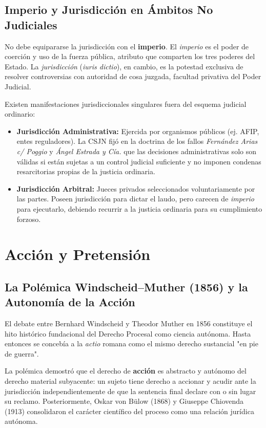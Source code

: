 \documentclass[12pt,oneside]{book}
\begin{document}
\subsection{Imperio y Jurisdicción en Ámbitos No Judiciales}
\begin{important}
No debe equipararse la jurisdicción con el \textbf{imperio}. El \textit{imperio} es el poder de coerción y uso de la fuerza pública, atributo que comparten los tres poderes del Estado. La \textit{jurisdicción} (\textit{iuris dictio}), en cambio, es la potestad exclusiva de resolver controversias con autoridad de cosa juzgada, facultad privativa del Poder Judicial.
\end{important}

Existen manifestaciones jurisdiccionales singulares fuera del esquema judicial ordinario:
\begin{itemize}
    \item \textbf{Jurisdicción Administrativa:} Ejercida por organismos públicos (ej. AFIP, entes reguladores). La CSJN fijó en la doctrina de los fallos \textit{Fernández Arias c/ Poggio} y \textit{Ángel Estrada y Cía.} que las decisiones administrativas solo son válidas si están sujetas a un control judicial suficiente y no imponen condenas resarcitorias propias de la justicia ordinaria.
    \item \textbf{Jurisdicción Arbitral:} Jueces privados seleccionados voluntariamente por las partes. Poseen jurisdicción para dictar el laudo, pero carecen de \textit{imperio} para ejecutarlo, debiendo recurrir a la justicia ordinaria para su cumplimiento forzoso.
\end{itemize}

\section{Acción y Pretensión}

\subsection{La Polémica Windscheid--Muther (1856) y la Autonomía de la Acción}
El debate entre Bernhard Windscheid y Theodor Muther en 1856 constituye el hito histórico fundacional del Derecho Procesal como ciencia autónoma. Hasta entonces se concebía a la \textit{actio} romana como el mismo derecho sustancial "en pie de guerra".

La polémica demostró que el derecho de \textbf{acción} es abstracto y autónomo del derecho material subyacente: un sujeto tiene derecho a accionar y acudir ante la jurisdicción independientemente de que la sentencia final declare con o sin lugar su reclamo. Posteriormente, Oskar von Bülow (1868) y Giuseppe Chiovenda (1913) consolidaron el carácter científico del proceso como una relación jurídica autónoma.
\end{document}
